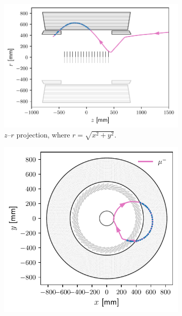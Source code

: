 \begin{figure}
    \centering
    \begin{subfigure}{0.56\textwidth}
        \centering
        \includegraphics[width=\textwidth]{chapter6/mu-_track_zy.pdf}
        \caption{$z$--$r$ projection, where $r = \sqrt{x^2+y^2}$.}
    \end{subfigure}
    \hfill
    \begin{subfigure}{0.43\textwidth}
        \centering
        \includegraphics[width=\textwidth]{chapter6/mu-_track_xy.pdf}

\end{subfigure}
\end{figure}
